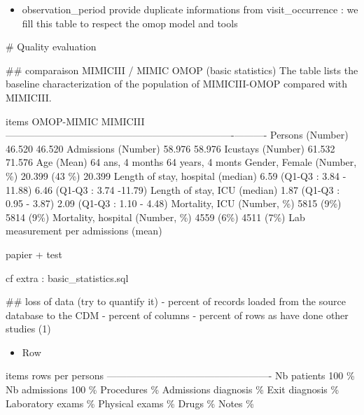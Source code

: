 \begin{itemize}
\tightlist
\item
  observation\_period provide duplicate informations from
  visit\_occurrence : we fill this table to respect the omop model and
  tools
\end{itemize}

\# Quality evaluation

\#\# comparaison MIMICIII / MIMIC OMOP (basic statistics) The table
lists the baseline characterization of the population of MIMICIII-OMOP
compared with MIMICIII.

\textbar{} items \textbar{}OMOP-MIMIC \textbar{} MIMICIII \textbar{}
\textbar{}---------------------------------------\textbar{}-------------------------------\textbar{}----------\textbar{}
\textbar{} Persons (Number) \textbar{} 46.520 \textbar{} 46.520
\textbar{} \textbar{} Admissions (Number) \textbar{} 58.976 \textbar{}
58.976 \textbar{} \textbar{} Icustays (Number) \textbar{} 61.532
\textbar{} 71.576 \textbar{} \textbar{} Age (Mean) \textbar{} 64 ans, 4
months \textbar{} 64 years, 4 monts \textbar{} \textbar{} Gender, Female
(Number, \%) \textbar{} 20.399 (43 \%) \textbar{} 20.399 \textbar{}
\textbar{} Length of stay, hospital (median) \textbar{} 6.59 (Q1-Q3 :
3.84 - 11.88) \textbar{} 6.46 (Q1-Q3 : 3.74 -11.79) \textbar{}
\textbar{} Length of stay, ICU (median) \textbar{} 1.87 (Q1-Q3 : 0.95 -
3.87) \textbar{} 2.09 (Q1-Q3 : 1.10 - 4.48) \textbar{} \textbar{}
Mortality, ICU (Number, \%) \textbar{} 5815 (9\%) \textbar{} 5814 (9\%)
\textbar{} \textbar{} Mortality, hospital (Number, \%) \textbar{} 4559
(6\%) \textbar{} 4511 (7\%) \textbar{} \textbar{} Lab measurement per
admissions (mean) \textbar{} \textbar{} \textbar{}

papier + test

cf extra : basic\_statistics.sql

\#\# loss of data (try to quantify it) - percent of records loaded from
the source database to the CDM - percent of columns - percent of rows as
have done other studies (1)

\begin{itemize}
\tightlist
\item
  Row
\end{itemize}

\textbar{} items \textbar{}rows per persons\textbar{}
\textbar{}-----------------------------------\textbar{}----------------\textbar{}
\textbar{} Nb patients \textbar{} 100 \% \textbar{} \textbar{} Nb
admissions \textbar{} 100 \% \textbar{} \textbar{} Procedures \textbar{}
\% \textbar{} \textbar{} Admissions diagnosis \textbar{} \% \textbar{}
\textbar{} Exit diagnosis \textbar{} \% \textbar{} \textbar{} Laboratory
exams \textbar{} \% \textbar{} \textbar{} Physical exams \textbar{} \%
\textbar{} \textbar{} Drugs \textbar{} \% \textbar{} \textbar{} Notes
\textbar{} \% \textbar{}

